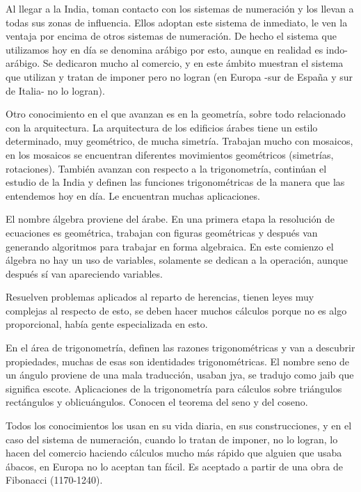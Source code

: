 Al llegar a la India, toman contacto con los sistemas de numeración y los llevan a todas sus zonas de influencia. Ellos adoptan este sistema de inmediato, le ven la ventaja por encima de otros sistemas de numeración. De hecho el sistema que utilizamos hoy en día se denomina arábigo por esto, aunque en realidad es indo-arábigo. Se dedicaron mucho al comercio, y en este ámbito muestran el sistema que utilizan y tratan de imponer pero no logran (en Europa -sur de España y sur de Italia- no lo logran).

Otro conocimiento en el que avanzan es en la geometría, sobre todo relacionado con la arquitectura. La arquitectura de los edificios árabes tiene un estilo determinado, muy geométrico, de mucha simetría. Trabajan mucho con mosaicos, en los mosaicos se encuentran diferentes movimientos geométricos (simetrías, rotaciones). También avanzan con respecto a la trigonometría, continúan el estudio de la India y definen las funciones trigonométricas de la manera que las entendemos hoy en día. Le encuentran muchas aplicaciones.

El nombre álgebra proviene del árabe. En una primera etapa la resolución de ecuaciones es geométrica, trabajan con figuras geométricas y después van generando algoritmos para trabajar en forma algebraica. En este comienzo el álgebra no hay un uso de variables, solamente se dedican a la operación, aunque después sí van apareciendo variables. 

Resuelven problemas aplicados al reparto de herencias, tienen leyes muy complejas al respecto de esto, se deben hacer muchos cálculos porque no es algo proporcional, había gente especializada en esto. 

En el área de trigonometría, definen las razones trigonométricas y van a descubrir propiedades, muchas de esas son identidades trigonométricas. El nombre seno de un ángulo proviene de una mala traducción, usaban jya, se tradujo como jaib que significa escote. Aplicaciones de la trigonometría para cálculos sobre triángulos rectángulos y oblicuángulos. Conocen el teorema del seno y del coseno.

Todos los conocimientos los usan en su vida diaria, en sus construcciones, y en el caso del sistema de numeración, cuando lo tratan de imponer, no lo logran, lo hacen del comercio haciendo cálculos mucho más rápido que alguien que usaba ábacos, en Europa no lo aceptan tan fácil. Es aceptado a partir de una obra de Fibonacci (1170-1240). 

